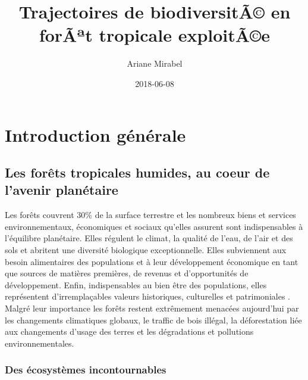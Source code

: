 \documentclass[
  11pt,
  french,
  A4paper,
  extrafontsizes,onecolumn,openright
  ]{memoir}
\title{Trajectoires de biodiversitÃ© en forÃªt tropicale exploitÃ©e}
\author{Ariane Mirabel}
\date{2018-06-08}
\begin{document}
\frontmatter



\makeflyleaf









\LargeMargins
{
\hypersetup{linkcolor=}
\setcounter{tocdepth}{3}
\tableofcontents
}



\LargeMargins
\mainmatter

\chapter{Introduction générale}\label{introduction-generale}

\section{Les forêts tropicales humides, au coeur de l'avenir
planétaire}\label{les-forets-tropicales-humides-au-coeur-de-lavenir-planetaire}

Les forêts couvrent 30\% de la surface terrestre et les nombreux biens
et services environnementaux, économiques et sociaux qu'elles assurent
sont indispensables à l'équilibre planétaire. Elles régulent le climat,
la qualité de l'eau, de l'air et des sols et abritent une diversité
biologique exceptionnelle. Elles subviennent aux besoin alimentaires des
populations et à leur développement économique en tant que sources de
matières premières, de revenus et d'opportunités de développement.
Enfin, indispensables au bien être des populations, elles représentent
d'irremplaçables valeurs historiques, culturelles et patrimoniales
\autocites{FRA2015}{Tilman2014}. Malgré leur importance les forêts
restent extrêmement menacées aujourd'hui par les changements climatiques
globaux, le traffic de bois illégal, la déforestation liée aux
changements d'usage des terres et les dégradations et pollutions
environnementales.

\subsection{Des écosystèmes
incontournables}\label{des-ecosystemes-incontournables}
\end{document}

